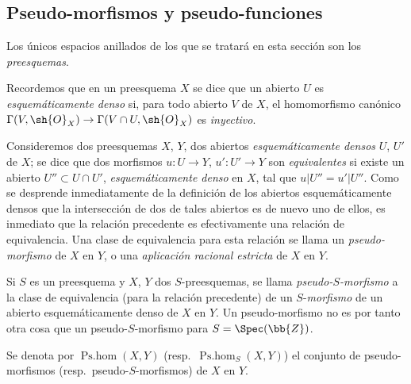 \subsection{Pseudo-morfismos y pseudo-funciones}
\label{IV.20.2}

Los únicos espacios anillados de los que se tratará en esta sección son los \emph{preesquemas}.

\begin{env}[20.2.1]
\label{IV.20.2.1}
Recordemos  que en un preesquema $X$ se dice que un abierto $U$ es \emph{esquemáticamente denso} si, para todo abierto $V$ de $X$, el homomorfismo canónico $\Gamma(V,\sh{O}_X)\to\Gamma(V\cap U,\sh{O}_X)$ es \emph{inyectivo}.

Consideremos dos preesquemas $X$, $Y$, dos abiertos \emph{esquemáticamente densos} $U$, $U'$ de $X$; se dice que dos morfismos $u:U\to Y$, $u':U'\to Y$ son \emph{equivalentes} si existe un abierto $U''\subset U\cap U'$, \emph{esquemáticamente denso} en $X$, tal que $u|U''=u'|U''$.
Como se desprende inmediatamente de la definición de los abiertos esquemáticamente densos que la intersección de dos de tales abiertos es de nuevo uno de ellos, es inmediato que la relación precedente es efectivamente una relación de equivalencia.
Una clase de equivalencia para esta relación se llama un \emph{pseudo-morfismo} de $X$ en $Y$, o una \emph{aplicación racional estricta} de $X$ en $Y$.

Si $S$ es un preesquema y $X$, $Y$ dos $S$-preesquemas, se llama \emph{pseudo-$S$-morfismo} a la clase de equivalencia (para la relación precedente) de un $S$-\emph{morfismo} de un abierto esquemáticamente denso de $X$ en $Y$.
Un pseudo-morfismo no es por tanto otra cosa que un pseudo-$S$-morfismo para $S=\Spec(\bb{Z})$.

Se denota por $\operatorname{Ps.hom}(X,Y)$ (resp.\ $\operatorname{Ps.hom}_S(X,Y)$) el conjunto de pseudo-morfismos (resp.\ pseudo-$S$-morfismos) de $X$ en $Y$.
\end{env}



